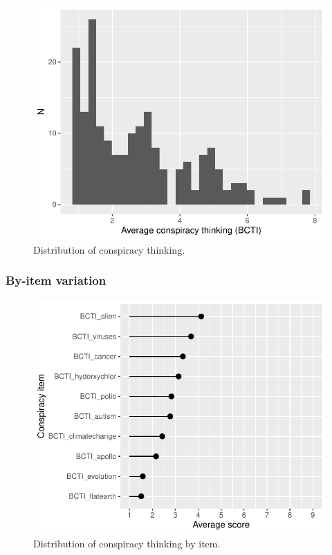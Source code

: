 \documentclass[
  doc,floatsintext]{apa6}
\begin{document}
\begin{figure}
\centering
\includegraphics{output/figures/exp2-conspiracy-distribution.pdf}
\caption{\label{fig:exp2-conspiracy-distribution}Distribution of conspiracy thinking.}
\end{figure}

\subsubsection{By-item variation}\label{by-item-variation-1}



\begin{figure}
\centering
\includegraphics{output/figures/exp2-conspiracy-items.pdf}
\caption{\label{fig:exp2-conspiracy-items}Distribution of conspiracy thinking by item.}
\end{figure}
\end{document}
